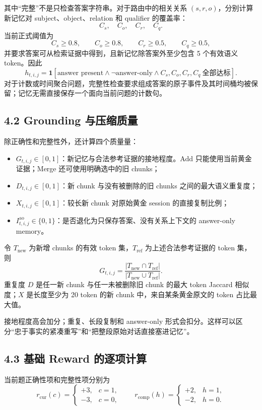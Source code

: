 \documentclass[a4paper,11pt]{article}
\begin{document}
其中“完整”不是只检查答案字符串。对于路由中的相关关系
$(s,r,o)$，分别计算新记忆对 subject、object、relation 和 qualifier 的覆盖率：
\[
    C_s,\quad C_o,\quad C_r,\quad C_q.
\]
当前正式阈值为
\[
    C_s\ge0.8,\qquad
    C_o\ge0.8,\qquad
    C_r\ge0.5,\qquad
    C_q\ge0.5,
\]
并要求答案可从检索证据中得到，且新记忆除答案外至少包含 5 个有效语义 token。因此
\[
    h_{t,i,j}
    =
    \mathbf{1}\!\left[
      \text{answer present}
      \land \neg\text{answer-only}
      \land C_s,C_o,C_r,C_q\ \text{全部达标}
    \right].
\]
对于计数或时间聚合问题，完整性检查要求组成答案的原子事件及其时间桶均被保留；记忆无需直接保存一个面向当前问题的计数句。

\subsection*{4.2 Grounding 与压缩质量}

除正确性和完整性外，还计算四个质量量：

\begin{itemize}
    \item $G_{t,i,j}\in[0,1]$：新记忆与合法参考证据的接地程度。Add 只能使用当前黄金证据；Merge 还可使用明确选中的旧 chunks；
    \item $D_{t,i,j}\in[0,1]$：新 chunk 与没有被删除的旧 chunks 之间的最大语义重复度；
    \item $X_{t,i,j}\in[0,1]$：较长新 chunk 对原始黄金 session 的直接复制比例；
    \item $I^{\mathrm{ao}}_{t,i,j}\in\{0,1\}$：是否退化为只保存答案、没有关系上下文的 answer-only memory。
\end{itemize}

令 $T_{\mathrm{new}}$ 为新增 chunks 的有效 token 集，$T_{\mathrm{ref}}$ 为上述合法参考证据的 token 集，则
\[
    G_{t,i,j}
    =
    \frac{|T_{\mathrm{new}}\cap T_{\mathrm{ref}}|}
         {|T_{\mathrm{new}}\cup T_{\mathrm{ref}}|}.
\]
重复度 $D$ 是任一新 chunk 与任一未被删除旧 chunk 的最大 token Jaccard
相似度；$X$ 是长度至少为 20 token 的新 chunk 中，来自某条黄金原文的 token
占比最大值。

接地程度高会加分；重复、长段复制和 answer-only 形式会扣分。这样可以区分“忠于事实的紧凑重写”和“把整段原始对话直接塞进记忆”。

\subsection*{4.3 基础 Reward 的逐项计算}

当前题正确性项和完整性项分别为
\[
    r_{\mathrm{cur}}(c)=
    \begin{cases}
        +3, & c=1,\\
        -3, & c=0,
    \end{cases}
    \qquad
    r_{\mathrm{comp}}(h)=
    \begin{cases}
        +2, & h=1,\\
        -2, & h=0.
    \end{cases}
\]
\end{document}
